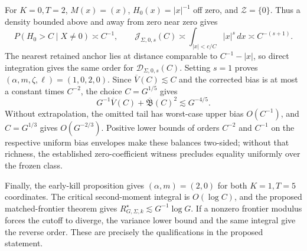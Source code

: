 For \(K=0,T=2\), \(M(x)=(x)\), \(H_0(x)=|x|^{-1}\) off zero, and \(\mathcal Z=\{0\}\). Thus a density bounded above and away from zero near zero gives
\[
P(H_0>C\mid X\ne0)\asymp C^{-1},
\qquad
\mathcal J_{\Sigma,0,s}(C)
\asymp\int_{|x|<c/C}|x|^s\,dx
\asymp C^{-(s+1)}.
\]
The nearest retained anchor lies at distance comparable to \(C^{-1}-|x|\), so direct integration gives the same order for \(\mathcal D_{\Sigma,0,s}(C)\). Setting \(s=1\) proves \((\alpha,m,\zeta,\ell)=(1,0,2,0)\). Since \(\overline V(C)\lesssim C\) and the corrected bias is at most a constant times \(C^{-2}\), the choice \(C=G^{1/5}\) gives
\[
G^{-1}\overline V(C)+\overline{\mathfrak B}(C)^2
\lesssim G^{-4/5}.
\]
Without extrapolation, the omitted tail has worst-case upper bias \(O(C^{-1})\), and \(C=G^{1/3}\) gives \(O(G^{-2/3})\). Positive lower bounds of orders \(C^{-2}\) and \(C^{-1}\) on the respective uniform bias envelopes make these balances two-sided; without that richness, the established zero-coefficient witness precludes equality uniformly over the frozen class.

Finally, the early-kill proposition gives \((\alpha,m)=(2,0)\) for both \(K=1,T=5\) coordinates. The critical second-moment integral is \(O(\log C)\), and the proposed matched-frontier theorem gives \(R_{G,\Sigma,k}^{\star}\lesssim G^{-1}\log G\). If a nonzero frontier modulus forces the cutoff to diverge, the variance lower bound and the same integral give the reverse order. These are precisely the qualifications in the proposed statement.